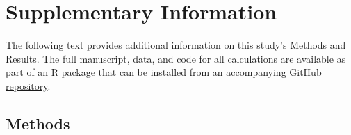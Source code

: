 \documentclass[12pt]{article}
\newcommand{\beginsupplement}{%
        \setcounter{table}{0}
        \renewcommand{\thetable}{S\arabic{table}}%
        \setcounter{figure}{0}
        \renewcommand{\thefigure}{S\arabic{figure}}%
     }
\begin{document}
 
\beginsupplement

\baselineskip24pt

\section*{Supplementary Information}%

The following text provides additional information on this study's Methods and Results.  The full manuscript, data, and code for all calculations are available as part of an R package that can be installed from an accompanying \href{https://github.com/agroimpacts/ecoscales}{GitHub repository}.

\subsection*{Methods}%
\end{document}
